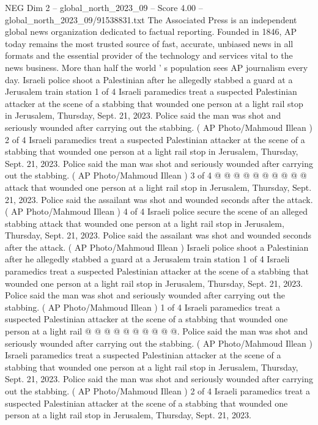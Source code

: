 \begin{textsample}{NEG Dim 2 – global\_north\_2023\_09 – Score 4.00 – global\_north\_2023\_09/91538831.txt}  \label{ex:f2_neg_075}
The Associated Press is an independent global news organization dedicated to factual reporting.
Founded in 1846, AP today remains the most trusted source of fast, accurate, unbiased news in all formats and the essential provider of the technology and services vital to the news business.
More than half the world ' s population sees AP journalism every day.
Israeli police shoot a Palestinian after he allegedly stabbed a guard at a Jerusalem train station 1 of 4 Israeli paramedics treat a suspected Palestinian attacker at the scene of a stabbing that wounded one person at a light rail stop in Jerusalem, Thursday, Sept. 21, 2023.
Police said the man was shot and seriously wounded after carrying out the stabbing. ( AP Photo/Mahmoud Illean ) 2 of 4 Israeli paramedics treat a suspected Palestinian attacker at the scene of a stabbing that wounded one person at a light rail stop in Jerusalem, Thursday, Sept. 21, 2023.
Police said the man was shot and seriously wounded after carrying out the stabbing. ( AP Photo/Mahmoud Illean ) 3 of 4 @ @ @ @ @ @ @ @ @ @ attack that wounded one person at a light rail stop in Jerusalem, Thursday, Sept. 21, 2023.
Police said the assailant was shot and wounded seconds after the attack. ( AP Photo/Mahmoud Illean ) 4 of 4 Israeli police secure the scene of an alleged stabbing attack that wounded one person at a light rail stop in Jerusalem, Thursday, Sept. 21, 2023.
Police said the assailant was shot and wounded seconds after the attack. ( AP Photo/Mahmoud Illean ) Israeli police shoot a Palestinian after he allegedly stabbed a guard at a Jerusalem train station 1 of 4 Israeli paramedics treat a suspected Palestinian attacker at the scene of a stabbing that wounded one person at a light rail stop in Jerusalem, Thursday, Sept. 21, 2023.
Police said the man was shot and seriously wounded after carrying out the stabbing. ( AP Photo/Mahmoud Illean ) 1 of 4 Israeli paramedics treat a suspected Palestinian attacker at the scene of a stabbing that wounded one person at a light rail @ @ @ @ @ @ @ @ @ @.
Police said the man was shot and seriously wounded after carrying out the stabbing. ( AP Photo/Mahmoud Illean ) Israeli paramedics treat a suspected Palestinian attacker at the scene of a stabbing that wounded one person at a light rail stop in Jerusalem, Thursday, Sept. 21, 2023.
Police said the man was shot and seriously wounded after carrying out the stabbing. ( AP Photo/Mahmoud Illean ) 2 of 4 Israeli paramedics treat a suspected Palestinian attacker at the scene of a stabbing that wounded one person at a light rail stop in Jerusalem, Thursday, Sept. 21, 2023.

\end{textsample}
